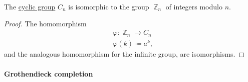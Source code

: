 \begin{proposition}\label{thm:cyclic_group_isomorphic_to_integers_modulo_n}
  The \hyperref[def:cyclic_group]{cyclic group} \( C_n \) is isomorphic to the group \hyperref[def:group_of_integers_modulo]{\( \BbbZ_n \)} of integers modulo \( n \).
\end{proposition}
\begin{proof}
  The homomorphism
  \begin{equation*}
    \begin{aligned}
      &\varphi: \BbbZ_n \to C_n \\
      &\varphi(k) \coloneqq a^k,
    \end{aligned}
  \end{equation*}
  and the analogous homomorphism for the infinite group, are isomorphisms.
\end{proof}

\paragraph{Grothendieck completion}

